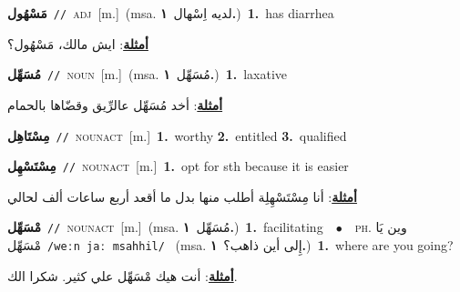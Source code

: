 \documentclass[10pt,a4paper,twoside]{article} %
\begin{document}
\begin{multicols}{2}
{\setlength\topsep{0pt}\textbf{\foreignlanguage{arabic}{مَسْهُول}}\ {\color{gray}\texttt{//}\color{black}}\ \textsc{adj}\ [m.]\ \color{gray}(msa. \foreignlanguage{arabic}{لديه اِسْهال}~\foreignlanguage{arabic}{\textbf{١.}})\color{black}\ \textbf{1.}~has diarrhea\  \begin{flushright}\color{gray}\foreignlanguage{arabic}{\textbf{\underline{\foreignlanguage{arabic}{أمثلة}}}: ايش مالك، مَسْهُول؟}\end{flushright}\color{black}} \vspace{2mm}

{\setlength\topsep{0pt}\textbf{\foreignlanguage{arabic}{مُسَهِّل}}\ {\color{gray}\texttt{//}\color{black}}\ \textsc{noun}\ [m.]\ \color{gray}(msa. \foreignlanguage{arabic}{مُسَهِّل}~\foreignlanguage{arabic}{\textbf{١.}})\color{black}\ \textbf{1.}~laxative\  \begin{flushright}\color{gray}\foreignlanguage{arabic}{\textbf{\underline{\foreignlanguage{arabic}{أمثلة}}}: أخد مُسَهِّل عالرِّيق وقضّاها بالحمام}\end{flushright}\color{black}} \vspace{2mm}

{\setlength\topsep{0pt}\textbf{\foreignlanguage{arabic}{مِسْتَاهِل}}\ {\color{gray}\texttt{//}\color{black}}\ \textsc{noun\textunderscore act}\ [m.]\ \textbf{1.}~worthy  \textbf{2.}~entitled  \textbf{3.}~qualified\ } \vspace{2mm}

{\setlength\topsep{0pt}\textbf{\foreignlanguage{arabic}{مِسْتَسْهِل}}\ {\color{gray}\texttt{//}\color{black}}\ \textsc{noun\textunderscore act}\ [m.]\ \textbf{1.}~opt for sth because it is easier\  \begin{flushright}\color{gray}\foreignlanguage{arabic}{\textbf{\underline{\foreignlanguage{arabic}{أمثلة}}}: أنا مِسْتَسْهِلِة أطلب منها بدل ما أقعد أربع ساعات ألف لحالي}\end{flushright}\color{black}} \vspace{2mm}

{\setlength\topsep{0pt}\textbf{\foreignlanguage{arabic}{مْسَهِّل}}\ {\color{gray}\texttt{//}\color{black}}\ \textsc{noun\textunderscore act}\ [m.]\ \color{gray}(msa. \foreignlanguage{arabic}{مُسَهِّل}~\foreignlanguage{arabic}{\textbf{١.}})\color{black}\ \textbf{1.}~facilitating\ \ $\bullet$\ \ \textsc{ph.} \color{gray} \foreignlanguage{arabic}{وين يَا مْسَهِّل}\color{black}\ {\color{gray}\texttt{/{\sffamily weːn jaː msahhil}/}\color{black}}\ \color{gray} (msa. \foreignlanguage{arabic}{إِلى أين ذاهب؟}~\foreignlanguage{arabic}{\textbf{١.}})\color{black}\ \textbf{1.}~where are you going?\  \begin{flushright}\color{gray}\foreignlanguage{arabic}{\textbf{\underline{\foreignlanguage{arabic}{أمثلة}}}: أنت هيك مْسَهِّل علي كثير. شكرا الك.}\end{flushright}\color{black}} \vspace{2mm}


\end{multicols}
\end{document}
